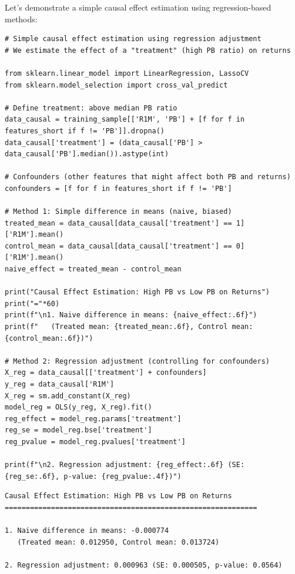 Let's demonstrate a simple causal effect estimation using regression-based methods:

\begin{verbatim}
# Simple causal effect estimation using regression adjustment
# We estimate the effect of a "treatment" (high PB ratio) on returns

from sklearn.linear_model import LinearRegression, LassoCV
from sklearn.model_selection import cross_val_predict

# Define treatment: above median PB ratio
data_causal = training_sample[['R1M', 'PB'] + [f for f in features_short if f != 'PB']].dropna()
data_causal['treatment'] = (data_causal['PB'] > data_causal['PB'].median()).astype(int)

# Confounders (other features that might affect both PB and returns)
confounders = [f for f in features_short if f != 'PB']

# Method 1: Simple difference in means (naive, biased)
treated_mean = data_causal[data_causal['treatment'] == 1]['R1M'].mean()
control_mean = data_causal[data_causal['treatment'] == 0]['R1M'].mean()
naive_effect = treated_mean - control_mean

print("Causal Effect Estimation: High PB vs Low PB on Returns")
print("="*60)
print(f"\n1. Naive difference in means: {naive_effect:.6f}")
print(f"   (Treated mean: {treated_mean:.6f}, Control mean: {control_mean:.6f})")

# Method 2: Regression adjustment (controlling for confounders)
X_reg = data_causal[['treatment'] + confounders]
y_reg = data_causal['R1M']
X_reg = sm.add_constant(X_reg)
model_reg = OLS(y_reg, X_reg).fit()
reg_effect = model_reg.params['treatment']
reg_se = model_reg.bse['treatment']
reg_pvalue = model_reg.pvalues['treatment']

print(f"\n2. Regression adjustment: {reg_effect:.6f} (SE: {reg_se:.6f}, p-value: {reg_pvalue:.4f})")
\end{verbatim}

\begin{verbatim}
Causal Effect Estimation: High PB vs Low PB on Returns
============================================================

1. Naive difference in means: -0.000774
   (Treated mean: 0.012950, Control mean: 0.013724)

2. Regression adjustment: 0.000963 (SE: 0.000505, p-value: 0.0564)
\end{verbatim}

